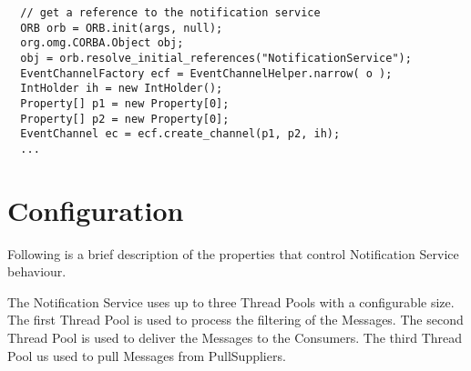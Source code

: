 \small{
\begin{verbatim}
  // get a reference to the notification service
  ORB orb = ORB.init(args, null);
  org.omg.CORBA.Object obj; 
  obj = orb.resolve_initial_references("NotificationService");
  EventChannelFactory ecf = EventChannelHelper.narrow( o );
  IntHolder ih = new IntHolder();
  Property[] p1 = new Property[0];
  Property[] p2 = new Property[0];
  EventChannel ec = ecf.create_channel(p1, p2, ih);
  ...
\end{verbatim}
}

\section{Configuration}
\label{sec:ntfy-configuration}

Following is a brief description of the properties
that control Notification Service behaviour.

The Notification Service uses up to three Thread Pools with a configurable
size. The first Thread Pool is used to process the filtering of the
Messages. The second Thread Pool is used to deliver the Messages to the
Consumers. The third Thread Pool us used to pull Messages from PullSuppliers. 

